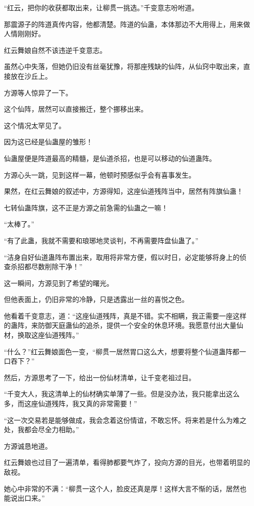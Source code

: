 \begin{this_body}
“红云，把你的收获都取出来，让柳贯一挑选。”千变意志吩咐道。

那震源子的阵道真传内容，他都清楚。阵道的仙蛊，本体那边不大用得上，用来做人情刚刚好。

红云舞娘自然不该违逆千变意志。

虽然心中失落，但她仍旧没有丝毫犹豫，将那座残缺的仙阵，从仙窍中取出来，直接放在沙丘上。

方源等人惊异了一下。

这个仙阵，居然可以直接搬迁，整个挪移出来。

这个情况太罕见了。

因为这已经是仙蛊屋的雏形！

仙蛊屋便是阵道最高的精髓，是仙道杀招，也是可以移动的仙道蛊阵。

方源心头一跳，见到这样一幕，他顿时预感似乎会有喜事发生。

果然，在红云舞娘的叙述中，方源得知，这座仙道残阵当中，居然有阵旗仙蛊！

七转仙蛊阵旗，这不正是方源之前急需的仙蛊之一嘛！

“太棒了。”

“有了此蛊，我就不需要和琅琊地灵谈判，不再需要阵盘仙蛊了。”

“洁身自好仙道蛊阵布置出来，取用将非常方便，假以时日，必定能够将身上的侦查杀招都尽数削除干净！”

这一瞬间，方源见到了希望的曙光。

但他表面上，仍旧非常的冷静，只是透露出一丝的喜悦之色。

他看着千变意志，道：“这座仙道残阵，真是不错。实不相瞒，我正需要一座这样的蛊阵，来防御天庭蛊仙的追杀，提供一个安全的休息环境。我愿意付出大量仙材，换取这座仙道残阵。”

“什么？”红云舞娘面色一变，“柳贯一居然胃口这么大，想要将整个仙道蛊阵都一口吞下？”

然后，方源思考了一下，给出一份仙材清单，让千变老祖过目。

“千变大人，我这清单上的仙材确实单薄了一些。但是没办法，我只能拿出这么多，而这座仙道残阵，我又真的非常需要！”

“这一次交易若是能够做成，我会念着这份情谊，不敢忘怀。将来若是什么为难之处，我都会尽全力相助。”

方源诚恳地道。

红云舞娘也过目了一遍清单，看得肺都要气炸了，投向方源的目光，也带着明显的敌视。

她心中非常的不满：“柳贯一这个人，脸皮还真是厚！这样大言不惭的话，居然也能说出口来。”


\end{this_body}

